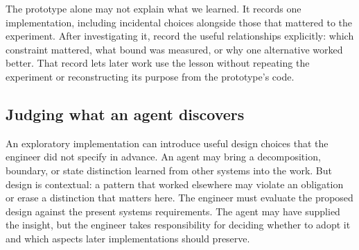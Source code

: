 The prototype alone may not explain what we learned. It records one implementation, including incidental choices alongside those that mattered to the experiment. After investigating it, record the useful relationships explicitly: which constraint mattered, what bound was measured, or why one alternative worked better. That record lets later work use the lesson without repeating the experiment or reconstructing its purpose from the prototype's code.

\subsection{Judging what an agent discovers}\label{heading:judging-what-an-agent-discovers}


An exploratory implementation can introduce useful design choices that the engineer did not specify in advance. An agent may bring a decomposition, boundary, or state distinction learned from other systems into the work. But design is contextual: a pattern that worked elsewhere may violate an obligation or erase a distinction that matters here. The engineer must evaluate the proposed design against the present system\textquotesingle s requirements. The agent may have supplied the insight, but the engineer takes responsibility for deciding whether to adopt it and which aspects later implementations should preserve.


